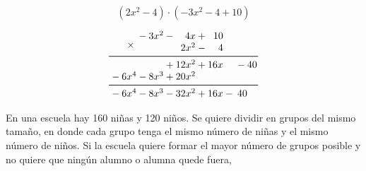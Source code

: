 \documentclass[11pt,addpoints]{exam}
\begin{document}
\begin{questions}
    \[(2x^2-4)\cdot(-3x^2-4+10)\]

    \begin{solutionbox}{5.5cm}
        \[ \begin{array}{*{16}{@{}>{{}}r<{{}}@{}}}
                 &  &   & \multirow{2.5}{*}{$ {}\times{} $} &  & - & 3x^2 &  & - & 4x    &  & + & 10  &   &    &    \\
                 &  &   &                                   &  &   &      &  &   & 2x^2  &  & - & 4   &   &    &    \\
                \cmidrule[0.6pt](l{-1pt}r{-1pt}){1-16}
                 &  &   &                                   &  &   &      &  & + & 12x^2 &  & + & 16x &   & -  & 40 \\
                 &  & - & 6x^4                              &  & - & 8x^3 &  & + & 20x^2 &  &   &     &   &    &    \\
                \cmidrule[0.6pt](l{-1pt}r{-1pt}){1-16}
                 &  & - & 6x^4                              &  & - & 8x^3 &  & - & 32x^2 &  & + & 16x & - & 40 &
            \end{array}
        \]
    \end{solutionbox}

    \newpage
    \question[20] En una escuela hay 160 niñas y 120 niños. Se quiere dividir en grupos del mismo tamaño,
    en donde cada grupo tenga el mismo número de niñas y el mismo número de niños. Si la escuela quiere formar el mayor número de grupos posible
    y no quiere que ningún alumno o alumna quede fuera,

    \begin{parts}

\end{parts}
\end{questions}
\end{document}
